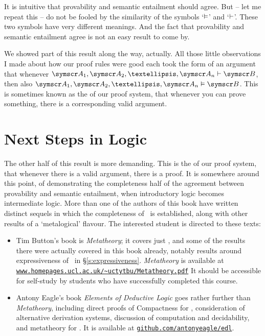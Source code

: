 It is intuitive that provability and semantic entailment should agree. But – let me repeat this – do not be fooled by the similarity of the symbols `$\vDash$' and `$\vdash$'. These two symbols have very different meanings. And the fact that provability and semantic entailment agree is not an easy result to come by. 

We showed part of this result along the way, actually. All those little observations I made about how our proof rules were good each took the form of an argument that whenever $\meta{A}_{1}, \meta{A}_{2}, …, \meta{A}_{n} \proves\meta{B}$, then also $\meta{A}_{1}, \meta{A}_{2}, …, \meta{A}_{n} \entails\meta{B}$. This is sometimes known as the  of our proof system, that whenever you can prove something, there is a corresponding valid argument.

\section{Next Steps in Logic}\label{s:nextsteps}

The other half of this result is more demanding. This is the  of our proof system, that whenever there is a valid argument, there is a proof. It is somewhere around this point, of demonstrating the completeness half of the agreement between  provability and semantic entailment, when introductory logic becomes intermediate logic. More than one of the authors of this book have written distinct sequels in which the completeness of \TFL\ is established, along with other results of a `metalogical' flavour. The interested student is directed to these texts: \begin{itemize}
	\item Tim Button's book is \emph{Metatheory}; it covers just \TFL, and some of the results there were actually covered in this book already, notably results around expressiveness of \TFL\ in §\ref{s:expressiveness}. \emph{Metatheory} is available at \href{http://www.homepages.ucl.ac.uk/~uctytbu/Metatheory.pdf}{\nolinkurl{www.homepages.ucl.ac.uk/~uctytbu/Metatheory.pdf}} It should be accessible for self-study by students who have successfully completed this course.

\item Antony Eagle's book \emph{Elements of Deductive Logic} goes rather further than \emph{Metatheory}, including direct proofs of Compactness for \TFL, consideration of alternative derivation systems, discussion of computation and decidability, and metatheory for \FOL. It is available at \href{https://github.com/antonyeagle/edl}{\nolinkurl{github.com/antonyeagle/edl}}.
\end{itemize}

